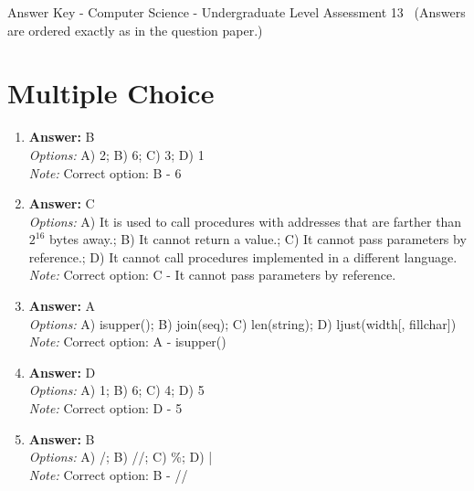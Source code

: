 \documentclass[12pt]{article}
\begin{document}
\begin{center}
Answer Key - Computer Science - Undergraduate Level Assessment 13 \
\small (Answers are ordered exactly as in the question paper.)
\end{center}

\section*{Multiple Choice}
\begin{enumerate}[label=\arabic*.]
\item \textbf{Answer:} B
\\ \textit{Options:} A) 2; B) 6; C) 3; D) 1
\\ \textit{Note:} Correct option: B - 6
\item \textbf{Answer:} C
\\ \textit{Options:} A) It is used to call procedures with addresses that are farther than $2^16$ bytes away.; B) It cannot return a value.; C) It cannot pass parameters by reference.; D) It cannot call procedures implemented in a different language.
\\ \textit{Note:} Correct option: C - It cannot pass parameters by reference.
\item \textbf{Answer:} A
\\ \textit{Options:} A) isupper(); B) join(seq); C) len(string); D) ljust(width[, fillchar])
\\ \textit{Note:} Correct option: A - isupper()
\item \textbf{Answer:} D
\\ \textit{Options:} A) 1; B) 6; C) 4; D) 5
\\ \textit{Note:} Correct option: D - 5
\item \textbf{Answer:} B
\\ \textit{Options:} A) /; B) //; C) \%; D) |
\\ \textit{Note:} Correct option: B - //
\end{enumerate}
\end{document}
